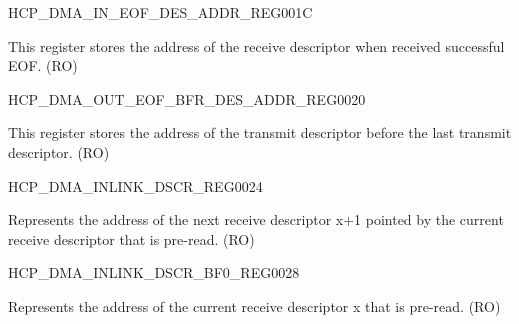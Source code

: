 \begin{register}{H}{CP\_DMA\_IN\_EOF\_DES\_ADDR\_REG}{\hexprefix{}001C}\label{regdesc:CPDMAINEOFDESADDRREG}
%
\regnewline%
\begin{regdesc}\begin{reglist}
\label{fielddesc:CPDMAINSUCEOFDESADDR}\item [CP\_DMA\_IN\_SUC\_EOF\_DES\_ADDR] This register stores the address of the receive descriptor when received successful EOF. (RO)
\end{reglist}\end{regdesc}
\end{register}


\begin{register}{H}{CP\_DMA\_OUT\_EOF\_BFR\_DES\_ADDR\_REG}{\hexprefix{}0020}\label{regdesc:CPDMAOUTEOFBFRDESADDRREG}
%
\regnewline%
\begin{regdesc}\begin{reglist}
\label{fielddesc:CPDMAOUTEOFBFRDESADDR}\item [CP\_DMA\_OUT\_EOF\_BFR\_DES\_ADDR] This register stores the address of the transmit descriptor before the last transmit descriptor. (RO)
\end{reglist}\end{regdesc}
\end{register}


\begin{register}{H}{CP\_DMA\_INLINK\_DSCR\_REG}{\hexprefix{}0024}\label{regdesc:CPDMAINLINKDSCRREG}
%
\regnewline%
\begin{regdesc}\begin{reglist}
\label{fielddesc:CPDMAINLINKDSCR}\item [CP\_DMA\_INLINK\_DSCR] Represents the address of the next receive descriptor x+1 pointed by the current receive descriptor that is pre-read. (RO)
\end{reglist}\end{regdesc}
\end{register}


\begin{register}{H}{CP\_DMA\_INLINK\_DSCR\_BF0\_REG}{\hexprefix{}0028}\label{regdesc:CPDMAINLINKDSCRBF0REG}
%
\regnewline%
\begin{regdesc}\begin{reglist}
\label{fielddesc:CPDMAINLINKDSCRBF0}\item [CP\_DMA\_INLINK\_DSCR\_BF0] Represents the address of the current receive descriptor x that is pre-read. (RO)
\end{reglist}\end{regdesc}
\end{register}


